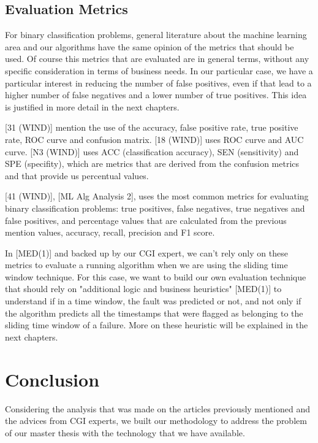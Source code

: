 \subsection{Evaluation Metrics}

For binary classification problems, general literature about the machine learning area and our algorithms have the same opinion of the metrics that should be used. Of course this metrics that are evaluated are in general terms, without any specific consideration in terms of business needs. In our particular case, we have a particular interest in reducing the number of false positives, even if that lead to a higher number of false negatives and a lower number of true positives. This idea is justified in more detail in the next chapters.

[31 (WIND)] mention the use of the accuracy, false positive rate, true positive rate, ROC curve and confusion matrix. [18 (WIND)] uses ROC curve and AUC curve. 
[N3 (WIND)] uses ACC (classification accuracy), SEN (sensitivity) and SPE (specifity), which are metrics that are derived from the confusion metrics and that provide us percentual values.

[41 (WIND)], [ML Alg Analysis 2], uses the most common metrics for evaluating binary classification problems: true positives, false negatives, true negatives and false positives, and percentage values that are calculated from the previous mention values, accuracy, recall, precision and F1 score.

In [MED(1)] and backed up by our CGI expert, we can't rely only on these metrics to evaluate a running algorithm when we are using the sliding time window technique. For this case, we want to build our own evaluation technique that should rely on "additional logic and business heuristics" [MED(1)] to understand if in a time window, the fault was predicted or not, and not only if the algorithm predicts all the timestamps that were flagged as belonging to the sliding time window of a failure. More on these heuristic will be explained in the next chapters.


\section{Conclusion} 
\label{sub:if_you_use_this_template} 

Considering the analysis that was made on the articles previously mentioned and the advices from CGI experts, we built our methodology to address the problem of our master thesis with the technology that we have available.

